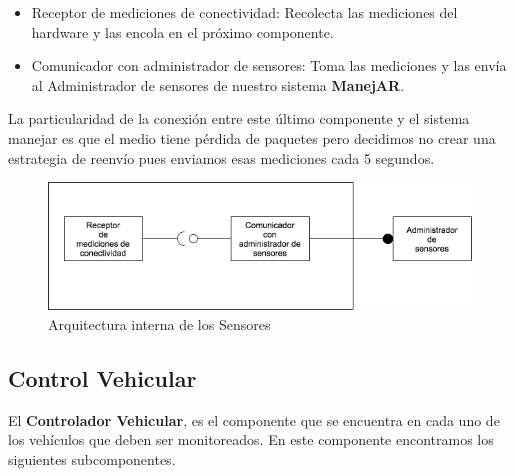 \begin{itemize}
  \item Receptor de mediciones de conectividad: Recolecta las mediciones del 
  hardware y las encola en el próximo componente.
  
  \item Comunicador con administrador de sensores: Toma las mediciones y las 
  envía al Administrador de sensores de nuestro sistema \textbf{ManejAR}.
\end{itemize}

La particularidad de la conexión entre este último componente y el sistema
manejar es que el medio tiene pérdida de paquetes pero decidimos no crear una 
estrategia de reenvío pues enviamos esas mediciones cada 5 segundos.


\begin{figure}
\centerline{\includegraphics[width=1\textwidth]{./imagenes/arquitectura_tp2/sensor.png}}
\caption{Arquitectura interna de los Sensores}
\end{figure}

\subsection{Control Vehicular}

El \textbf{Controlador Vehicular}, es el componente que se encuentra en cada uno de los vehículos
que deben ser monitoreados. En este componente encontramos los siguientes subcomponentes.

